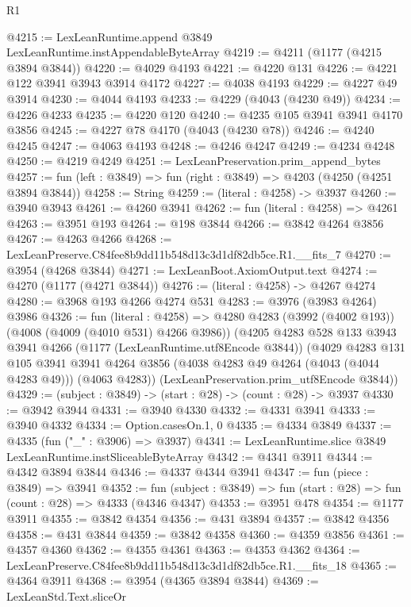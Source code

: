 \begin{lexlean}{R1}
\begin{coremodule}
@4215 := LexLeanRuntime.append @3849 LexLeanRuntime.instAppendableByteArray
@4219 := @4211 (@1177 (@4215 @3894 @3844))
@4220 := @4029 @4193
@4221 := @4220 @131
@4226 := @4221 @122 @3941 @3943 @3914 @4172
@4227 := @4038 @4193
@4229 := @4227 @49 @3914
@4230 := @4044 @4193
@4233 := @4229 (@4043 (@4230 @49))
@4234 := @4226 @4233
@4235 := @4220 @120
@4240 := @4235 @105 @3941 @3941 @4170 @3856
@4245 := @4227 @78 @4170 (@4043 (@4230 @78))
@4246 := @4240 @4245
@4247 := @4063 @4193
@4248 := @4246 @4247
@4249 := @4234 @4248
@4250 := @4219 @4249
@4251 := LexLeanPreservation.prim_append_bytes
@4257 := fun (left : @3849) => fun (right : @3849) => @4203 (@4250 (@4251 @3894 @3844))
@4258 := String
@4259 := (literal : @4258) -> @3937
@4260 := @3940 @3943
@4261 := @4260 @3941
@4262 := fun (literal : @4258) => @4261
@4263 := @3951 @193
@4264 := @198 @3844
@4266 := @3842 @4264 @3856
@4267 := @4263 @4266
@4268 := LexLeanPreserve.C84fee8b9dd11b548d13c3d1df82db5ce.R1.__fits_7
@4270 := @3954 (@4268 @3844)
@4271 := LexLeanBoot.AxiomOutput.text
@4274 := @4270 (@1177 (@4271 @3844))
@4276 := (literal : @4258) -> @4267 @4274
@4280 := @3968 @193 @4266 @4274 @531
@4283 := @3976 (@3983 @4264) @3986
@4326 := fun (literal : @4258) =>
  @4280
    @4283
    (@3992 (@4002 @193))
    (@4008 (@4009 (@4010 @531) @4266 @3986))
    (@4205
      @4283
      @528
      @133
      @3943
      @3941
      @4266
      (@1177 (LexLeanRuntime.utf8Encode @3844))
      (@4029
        @4283
        @131
        @105
        @3941
        @3941
        @4264
        @3856
        (@4038 @4283 @49 @4264 (@4043 (@4044 @4283 @49)))
        (@4063 @4283))
      (LexLeanPreservation.prim_utf8Encode @3844))
@4329 := (subject : @3849) -> (start : @28) -> (count : @28) -> @3937
@4330 := @3942 @3944
@4331 := @3940 @4330
@4332 := @4331 @3941
@4333 := @3940 @4332
@4334 := Option.casesOn.{1, 0}
@4335 := @4334 @3849
@4337 := @4335 (fun ("_" : @3906) => @3937)
@4341 := LexLeanRuntime.slice @3849 LexLeanRuntime.instSliceableByteArray
@4342 := @4341 @3911
@4344 := @4342 @3894 @3844
@4346 := @4337 @4344 @3941
@4347 := fun (piece : @3849) => @3941
@4352 := fun (subject : @3849) => fun (start : @28) => fun (count : @28) => @4333 (@4346 @4347)
@4353 := @3951 @478
@4354 := @1177 @3911
@4355 := @3842 @4354
@4356 := @431 @3894
@4357 := @3842 @4356
@4358 := @431 @3844
@4359 := @3842 @4358
@4360 := @4359 @3856
@4361 := @4357 @4360
@4362 := @4355 @4361
@4363 := @4353 @4362
@4364 := LexLeanPreserve.C84fee8b9dd11b548d13c3d1df82db5ce.R1.__fits_18
@4365 := @4364 @3911
@4368 := @3954 (@4365 @3894 @3844)
@4369 := LexLeanStd.Text.sliceOr

\end{coremodule}
\end{lexlean}
